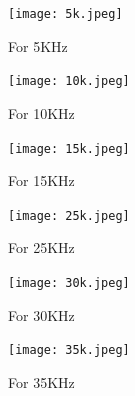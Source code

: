 \documentclass[a4paper]{article}
\begin{document}
\begin{figure}[h!]
    \centering
    \texttt{[image: 5k.jpeg]}
    \caption{For 5KHz}
\end{figure}

\begin{figure}[h!]
    \centering
    \texttt{[image: 10k.jpeg]}
    \caption{For 10KHz}
\end{figure}

\begin{figure}[h!]
    \centering
    \texttt{[image: 15k.jpeg]}
    \caption{For 15KHz}
\end{figure}

\begin{figure}[h!]
    \centering
    \texttt{[image: 25k.jpeg]}
    \caption{For 25KHz}
\end{figure}

\begin{figure}[h!]
    \centering
    \texttt{[image: 30k.jpeg]}
    \caption{For 30KHz}
\end{figure}

\begin{figure}[h!]
    \centering
    \texttt{[image: 35k.jpeg]}
    \caption{For 35KHz}
\end{figure}
\end{document}

